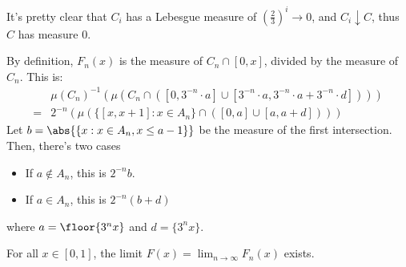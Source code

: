 \documentclass[11pt, headheight=30pt]{scrartcl}
\begin{document}
It's pretty clear that $C_i$ has a Lebesgue measure of
$\left(\frac23\right)^i\to 0$, and $C_i\downarrow C$,
thus $C$ has measure $0$.

\begin{claim*}
    By definition, $F_n(x)$ is the measure of $C_n\cap [0,x]$, divided
    by the measure of $C_n$. This is:
    \begin{align*}
        &\mu(C_n)^{-1}\left(\mu\left(C_n\cap \left([0,3^{-n}\cdot a]\cup [3^{-n}\cdot a, 3^{-n}\cdot a + 3^{-n}\cdot d]\right)\right)\right)\\
        =&2^{-n}\left(\mu\left(\{[x, x + 1] : x\in A_n\}\cap \left([0,a] \cup [a, a + d]\right)\right)\right)
    \end{align*}
    Let $b = \abs{\{x : x\in A_n, x\leq a - 1\}}$ be the measure
    of the first intersection.
    Then, there's two cases
    \begin{itemize}
        \item If $a\notin A_n$, this is $2^{-n}b$.
        \item If $a\in A_n$, this is $2^{-n}\left(b + d\right)$
    \end{itemize}
    where $a = \floor{3^nx}$ and $d = \{3^nx\}$.

\end{claim*}

\begin{prob}
    For all $x \in [0, 1]$, the limit $F(x) = \lim_{n \to \infty} F_n(x)$ exists.
\end{prob}
\end{document}
